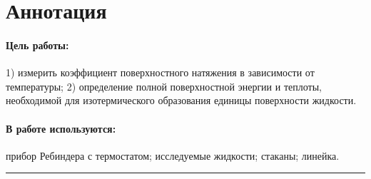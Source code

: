\documentclass[a4paper,12pt]{report}
\begin{document}
	
	\newpage
    \pagestyle{fancy}

    \fancyhead{}
    \fancyfoot{}
    \fancyhead[L]{\rightmark}
    \fancyhead[R]{\thepage}

    \section*{Аннотация}
        \paragraph*{Цель работы:} 1) измерить коэффициент поверхностного натяжения в зависимости от температуры; 2) определение полной поверхностной энергии и теплоты, необходимой для изотермического образования единицы поверхности жидкости.
        \paragraph*{В работе используются:} прибор Ребиндера с термостатом; исследуемые жидкости; стаканы; линейка.
    \vspace{0.5cm}
    \hrule
    
    
\end{document}

